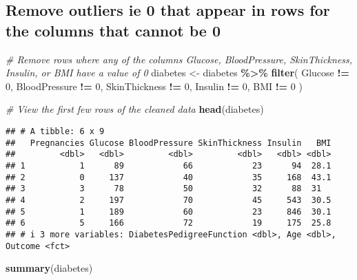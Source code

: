 \documentclass[
]{article}
\newenvironment{Shaded}{\begin{snugshade}}{\end{snugshade}}
\newcommand{\CommentTok}[1]{\textcolor[rgb]{0.56,0.35,0.01}{\textit{#1}}}
\newcommand{\DecValTok}[1]{\textcolor[rgb]{0.00,0.00,0.81}{#1}}
\newcommand{\FunctionTok}[1]{\textcolor[rgb]{0.13,0.29,0.53}{\textbf{#1}}}
\newcommand{\NormalTok}[1]{#1}
\newcommand{\OtherTok}[1]{\textcolor[rgb]{0.56,0.35,0.01}{#1}}
\newcommand{\SpecialCharTok}[1]{\textcolor[rgb]{0.81,0.36,0.00}{\textbf{#1}}}
\begin{document}
\subsection{Remove outliers ie 0 that appear in rows for the columns
that cannot be
0}\label{remove-outliers-ie-0-that-appear-in-rows-for-the-columns-that-cannot-be-0}

\begin{Shaded}
\begin{Highlighting}[]
\CommentTok{\# Remove rows where any of the columns Glucose, BloodPressure, SkinThickness, Insulin, or BMI have a value of 0}
\NormalTok{diabetes }\OtherTok{\textless{}{-}}\NormalTok{ diabetes }\SpecialCharTok{\%\textgreater{}\%}
  \FunctionTok{filter}\NormalTok{(}
\NormalTok{    Glucose }\SpecialCharTok{!=} \DecValTok{0}\NormalTok{,}
\NormalTok{    BloodPressure }\SpecialCharTok{!=} \DecValTok{0}\NormalTok{,}
\NormalTok{    SkinThickness }\SpecialCharTok{!=} \DecValTok{0}\NormalTok{,}
\NormalTok{    Insulin }\SpecialCharTok{!=} \DecValTok{0}\NormalTok{,}
\NormalTok{    BMI }\SpecialCharTok{!=} \DecValTok{0}
\NormalTok{  )}

\CommentTok{\# View the first few rows of the cleaned data}
\FunctionTok{head}\NormalTok{(diabetes)}
\end{Highlighting}
\end{Shaded}

\begin{verbatim}
## # A tibble: 6 x 9
##   Pregnancies Glucose BloodPressure SkinThickness Insulin   BMI
##         <dbl>   <dbl>         <dbl>         <dbl>   <dbl> <dbl>
## 1           1      89            66            23      94  28.1
## 2           0     137            40            35     168  43.1
## 3           3      78            50            32      88  31  
## 4           2     197            70            45     543  30.5
## 5           1     189            60            23     846  30.1
## 6           5     166            72            19     175  25.8
## # i 3 more variables: DiabetesPedigreeFunction <dbl>, Age <dbl>, Outcome <fct>
\end{verbatim}

\begin{Shaded}
\begin{Highlighting}[]
\FunctionTok{summary}\NormalTok{(diabetes)}
\end{Highlighting}
\end{Shaded}
\end{document}
